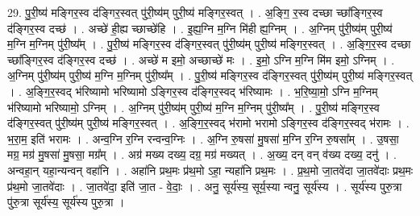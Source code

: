 \documentclass[17pt]{extarticle}
\begin{document}
29. पु॒री॒ष्य॑ मङ्गिर॒स्व द॑ङ्गिर॒स्वत् पु॑री॒ष्य॑म् पुरी॒ष्य॑ मङ्गिर॒स्वत् । . अ॒ङ्गि॒ र॒स्व दच्छा च्छा᳚ङ्गिर॒स्व द॑ङ्गिर॒स्व दच्छ॑ । . अच्छे॑ ही॒ह्य च्छाच्छे॑हि । . इ॒ह्य॒ग्नि म॒ग्नि मि॑ही ह्य॒ग्निम् । . अ॒ग्निम् पु॑री॒ष्य॑म् पुरी॒ष्य॑ म॒ग्नि म॒ग्निम् पु॑री॒ष्य᳚म् । . पु॒री॒ष्य॑ मङ्गिर॒स्व द॑ङ्गिर॒स्वत् पु॑री॒ष्य॑म् पुरी॒ष्य॑ मङ्गिर॒स्वत् । . अ॒ङ्गि॒र॒स्व दच्छा च्छा᳚ङ्गिर॒स्व द॑ङ्गिर॒स्व दच्छ॑ । . अच्छे॑ म इमो॒ अच्छाच्छे॑ मः । . इ॒मो॒ ऽग्नि म॒ग्नि मि॑म इमो॒ ऽग्निम् । . अ॒ग्निम् पु॑री॒ष्य॑म् पुरी॒ष्य॑ म॒ग्नि म॒ग्निम् पु॑री॒ष्य᳚म् । . पु॒री॒ष्य॑ मङ्गिर॒स्व द॑ङ्गिर॒स्वत् पु॑री॒ष्य॑म् पुरी॒ष्य॑ मङ्गिर॒स्वत् । . अ॒ङ्गि॒र॒स्वद् भ॑रिष्यामो भरिष्यामो ऽङ्गिर॒स्व द॑ङ्गिर॒स्वद् भ॑रिष्यामः । . भ॒रि॒ष्या॒मो॒ ऽग्नि म॒ग्निम् भ॑रिष्यामो भरिष्यामो॒ ऽग्निम् । . अ॒ग्निम् पु॑री॒ष्य॑म् पुरी॒ष्य॑ म॒ग्नि म॒ग्निम् पु॑री॒ष्य᳚म् । . पु॒री॒ष्य॑ मङ्गिर॒स्व द॑ङ्गिर॒स्वत् पु॑री॒ष्य॑म् पुरी॒ष्य॑ मङ्गिर॒स्वत् । . अ॒ङ्गि॒र॒स्वद् भ॑रामो भरामो ऽङ्गिर॒स्व द॑ङ्गिर॒स्वद् भ॑रामः । . भ॒रा॒म॒ इति॑ भरामः । . अन्व॒ग्नि र॒ग्नि रन्वन्व॒ग्निः । . अ॒ग्नि रु॒षसा॑ मु॒षसा॑ म॒ग्नि र॒ग्नि रु॒षसा᳚म् । . उ॒षसा॒ मग्र॒ मग्र॑ मु॒षसा॑ मु॒षसा॒ मग्र᳚म् । . अग्र॑ मख्य दख्य॒ दग्र॒ मग्र॑ मख्यत् । . अ॒ख्य॒ दन् वन् व॑ख्य दख्य॒ दनु॑ । . अन्वहा॒न् यहा॒न्यन्वन् वहा॑नि । . अहा॑नि प्रथ॒मः प्र॑थ॒मो ऽहा॒ न्यहा॑नि प्रथ॒मः । . प्र॒थ॒मो जा॒तवे॑दा जा॒तवे॑दाः प्रथ॒मः प्र॑थ॒मो जा॒तवे॑दाः । . जा॒तवे॑दा॒ इति॑ जा॒त - वे॒दाः॒ । . अनु॒ सूर्य॑स्य॒ सूर्य॒स्या न्वनु॒ सूर्य॑स्य । . सूर्य॑स्य पुरु॒त्रा पु॑रु॒त्रा सूर्य॑स्य॒ सूर्य॑स्य पुरु॒त्रा । \newline
\end{document}
